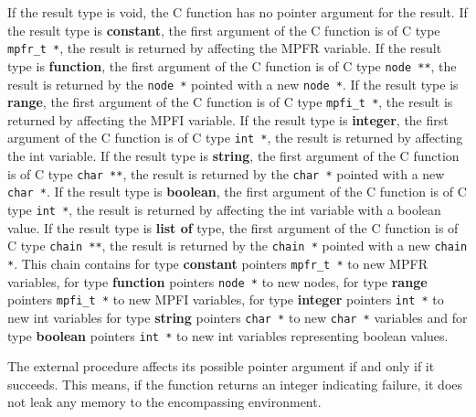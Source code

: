 \begin{itemize}
   If the \sollya result type is void, the C function has no pointer
   argument for the result.  If the \sollya result type is \textbf{constant}, the
   first argument of the C function is of C type \texttt{mpfr\_t *}, the result is
   returned by affecting the MPFR variable.  If the \sollya result type
   is \textbf{function}, the first argument of the C function is of C type \texttt{node **},
   the result is returned by the \texttt{node *} pointed with a new \texttt{node *}.
   If the \sollya result type is \textbf{range}, the first argument of the C
   function is of C type \texttt{mpfi\_t *}, the result is returned by affecting
   the MPFI variable.  If the \sollya result type is \textbf{integer}, the first
   argument of the C function is of C type \texttt{int *}, the result is returned
   by affecting the int variable.  If the \sollya result type is \textbf{string},
   the first argument of the C function is of C type \texttt{char **}, the result
   is returned by the \texttt{char *} pointed with a new \texttt{char *}.  If the \sollya
   result type is \textbf{boolean}, the first argument of the C function is of C
   type \texttt{int *}, the result is returned by affecting the int variable with
   a boolean value.  If the \sollya result type is \textbf{list of} type, the
   first argument of the C function is of C type \texttt{chain **}, the result is
   returned by the \texttt{chain *} pointed with a new \texttt{chain *}.  This chain
   contains for \sollya type \textbf{constant} pointers \texttt{mpfr\_t *} to new MPFR
   variables, for \sollya type \textbf{function} pointers \texttt{node *} to new nodes, for
   \sollya type \textbf{range} pointers \texttt{mpfi\_t *}  to new MPFI variables, for
   \sollya type \textbf{integer} pointers \texttt{int *} to new int variables for \sollya
   type \textbf{string} pointers \texttt{char *} to new \texttt{char *} variables and for \sollya
   type \textbf{boolean} pointers \texttt{int *} to new int variables representing boolean
   values.
    	       
   The external procedure affects its possible pointer argument if and
   only if it succeeds.  This means, if the function returns an integer
   indicating failure, it does not leak any memory to the encompassing
   environment.
    

\end{itemize}
